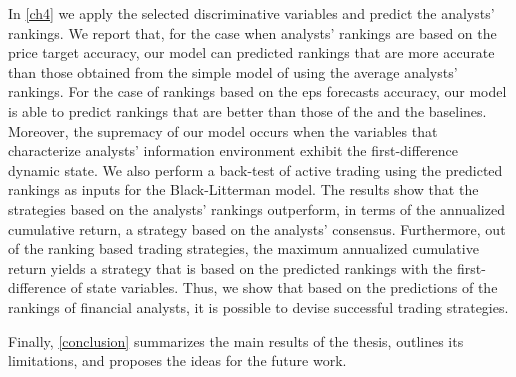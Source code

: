 In \ref{ch4} we apply the selected discriminative variables and predict the analysts' rankings. We report that, for the case when analysts' rankings are based on the price target accuracy,  our model can predicted rankings that are more  accurate than those obtained from the simple model of using the  average analysts' rankings. For the case of rankings based on the \gls{eps} forecasts accuracy, our model is able to predict rankings that are better than those of the  and the \naive{} baselines. Moreover, the supremacy of our model occurs when  the variables that characterize analysts' information environment exhibit the first-difference dynamic state. We also perform a back-test of active trading using the predicted rankings as inputs for the Black-Litterman model. The results show that the strategies based on the analysts' rankings outperform, in terms of the annualized cumulative return, a  strategy based on the analysts' consensus. Furthermore, out of the ranking based trading strategies, the maximum annualized cumulative return yields  a strategy that is based on the predicted rankings with the first-difference of state variables.  Thus, we show that based on the predictions of the rankings of financial analysts, it is possible to devise  successful trading strategies.

Finally, \ref{conclusion} summarizes the main results of the thesis, outlines its limitations, and proposes the ideas for the future work. 
